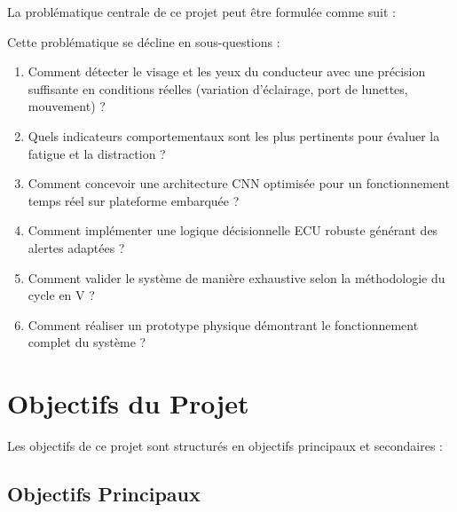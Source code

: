 \documentclass[12pt,a4paper,twoside]{report}
\begin{document}
La problématique centrale de ce projet peut être formulée comme suit :

\begin{center}
\end{center}

Cette problématique se décline en sous-questions :
\begin{enumerate}[leftmargin=2cm]
    \item Comment détecter le visage et les yeux du conducteur avec une précision suffisante en conditions réelles (variation d'éclairage, port de lunettes, mouvement) ?
    \item Quels indicateurs comportementaux sont les plus pertinents pour évaluer la fatigue et la distraction ?
    \item Comment concevoir une architecture CNN optimisée pour un fonctionnement temps réel sur plateforme embarquée ?
    \item Comment implémenter une logique décisionnelle ECU robuste générant des alertes adaptées ?
    \item Comment valider le système de manière exhaustive selon la méthodologie du cycle en V ?
    \item Comment réaliser un prototype physique démontrant le fonctionnement complet du système ?
\end{enumerate}

\section{Objectifs du Projet}

Les objectifs de ce projet sont structurés en objectifs principaux et secondaires :

\subsection{Objectifs Principaux}
\end{document}
